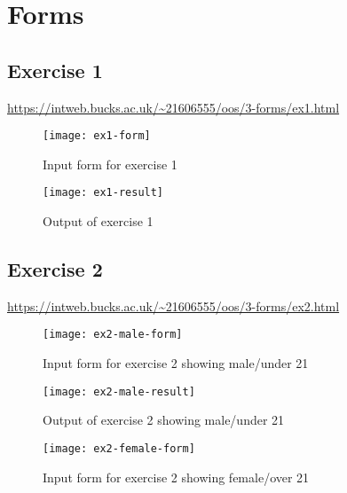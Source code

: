 \chapter{Forms}
\graphicspath{{3-forms/images/}}

\section{Exercise 1}

\url{https://intweb.bucks.ac.uk/~21606555/oos/3-forms/ex1.html}
\captionsetup{type=figure}


\clearpage
\captionsetup{type=figure}


\begin{figure}[H]
  \caption{Input form for exercise 1}
  \centering
  \texttt{[image: ex1-form]}
\end{figure}

\begin{figure}[H]
  \caption{Output of exercise 1}
  \centering
  \texttt{[image: ex1-result]}
\end{figure}

\clearpage
\section{Exercise 2}

\url{https://intweb.bucks.ac.uk/~21606555/oos/3-forms/ex2.html}
\captionsetup{type=figure}


\captionsetup{type=figure}


\begin{figure}[H]
  \caption{Input form for exercise 2 showing male/under 21}
  \centering
  \texttt{[image: ex2-male-form]}
\end{figure}

\begin{figure}[H]
  \caption{Output of exercise 2 showing male/under 21}
  \centering
  \texttt{[image: ex2-male-result]}
\end{figure}

\begin{figure}[H]
  \caption{Input form for exercise 2 showing female/over 21}
  \centering
  \texttt{[image: ex2-female-form]}
\end{figure}

